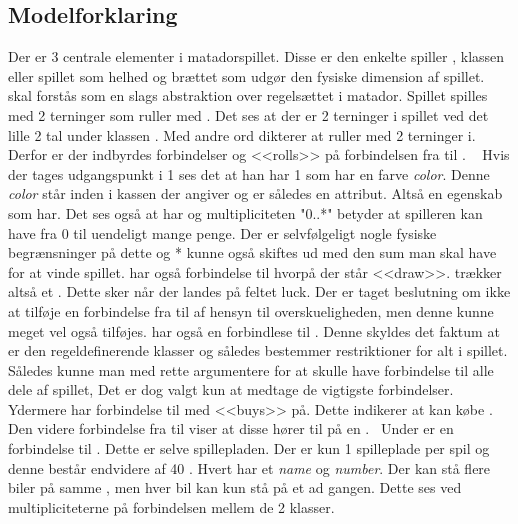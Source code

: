 \subsection{Modelforklaring}\label{chap:domain:sec:modelForklaring}
Der er 3 centrale elementer i matadorspillet. Disse er den enkelte spiller , klassen  eller spillet som helhed og brættet som udgør den fysiske dimension af spillet.  skal forstås som en slags abstraktion over regelsættet i matador. Spillet spilles med 2 terninger  som  ruller med . Det ses at der er 2 terninger i spillet ved det lille 2 tal under klassen . Med andre ord dikterer  at  ruller  med 2 terninger i. Derfor er der indbyrdes forbindelser og <<rolls>> på forbindelsen fra  til . \
\linebreak
Hvis der tages udgangspunkt i 1  ses det at han har 1  som har en farve \textit{color}. Denne \textit{color} står inden i kassen der angiver  og er således en attribut. Altså en egenskab som  har. Det ses også at  har  og multipliciteten "0..*" betyder at spilleren kan have fra 0 til uendeligt mange penge. Der er selvfølgeligt nogle fysiske begrænsninger på dette og * kunne også skiftes ud med den sum man skal have for at vinde spillet.  har også forbindelse til  hvorpå der står <<draw>>.  trækker altså et . Dette sker når der landes på feltet luck. Der er taget beslutning om ikke at tilføje en forbindelse fra  til  af hensyn til overskueligheden, men denne kunne meget vel også tilføjes.  har også en forbindlese til . Denne skyldes det faktum at  er den regeldefinerende klasser og således bestemmer restriktioner for alt i spillet. Således kunne man med rette argumentere for at  skulle have forbindelse til alle dele af spillet, Det er dog valgt kun at medtage de vigtigste forbindelser. Ydermere har  forbindelse til  med <<buys>> på. Dette indikerer at  kan købe . Den videre forbindelse fra  til  viser at disse hører til på en . \
Under  er en forbindelse til . Dette er selve spillepladen. Der er kun 1 spilleplade per spil og denne består endvidere af 40 . Hvert  har et \textit{name} og \textit{number}. Der kan stå flere biler på samme , men hver bil kan kun stå på et  ad gangen. Dette ses ved multipliciteterne på forbindelsen mellem de 2 klasser. \
